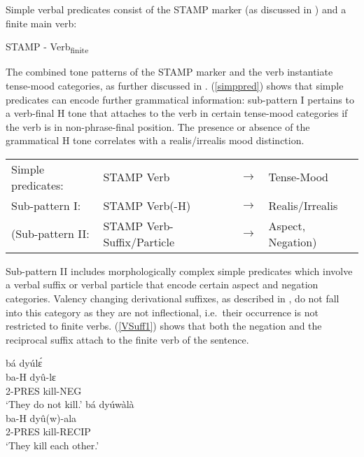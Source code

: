 Simple verbal predicates consist of the STAMP marker (as discussed in ) and a finite main verb:

\begin{center}
STAMP - Verb\textsubscript{finite}
\end{center}

\noindent The combined tone patterns of the STAMP marker and the verb instantiate tense-mood categories, as further discussed in . (\ref{simppred}) shows that simple predicates can encode further grammatical information: sub-pattern I pertains to a verb-final H tone that attaches to the verb in certain tense-mood categories if the verb is in non-phrase-final position. The presence or absence of the grammatical H tone correlates with a realis/irrealis mood distinction.

\begin{exe}
\ex \label{simppred}
\begin{tabular}{l|lll}
Simple predicates:   &  STAMP Verb & $\rightarrow$ & Tense-Mood \\ 
\hspace{.5cm} Sub-pattern I: &  STAMP Verb(-H) &  $\rightarrow$ & Realis/Irrealis \\
\hspace{.5cm} (Sub-pattern II: &  STAMP Verb-Suffix/Particle & $\rightarrow$ & Aspect, Negation) \\ 
\end{tabular}
\end{exe}

\noindent Sub-pattern II includes morphologically complex simple predicates which involve a verbal suffix or verbal particle that encode certain aspect and negation categories.
Valency changing derivational suffixes, as described in , do not fall into this category as they are not inflectional, i.e.\ their occurrence is not restricted to finite verbs. (\ref{VSuff1}) shows that both the negation and the reciprocal suffix attach to the finite verb of the sentence.

\begin{exe}
\ex\label{VSuff1}
\begin{xlist}
\ex \label{VSuff1a}
  \glll  bá dyúlɛ́ \\
          ba-H dyû-lɛ \\
            2-PRES kill-NEG \\
    \trans `They do not kill.'
\ex\label{VSuff1b}
 \glll  bá dyúwàlà \\
         ba-H dyû(w)-ala \\
	2-PRES kill-RECIP \\
    \trans `They kill each other.'
\end{xlist}
\end{exe}

